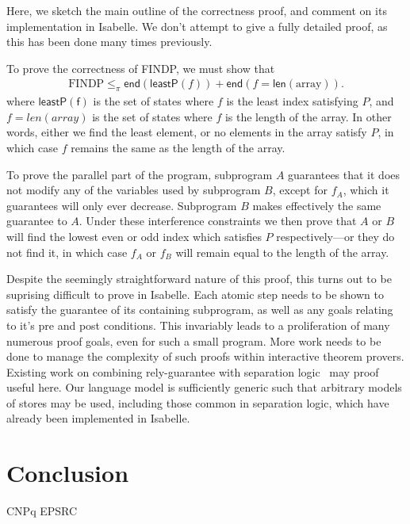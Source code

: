 \documentclass{llncs}
\newcommand{\edn}{\mathsf{end}}
\begin{document}
Here, we sketch the main outline of the correctness proof, and comment
on its implementation in Isabelle. We don't attempt to give a fully
detailed proof, as this has been done many times previously.

To prove the correctness of FINDP, we must show that
\begin{align*}
\text{FINDP} \le_\pi \edn(\mathsf{leastP}(f)) + \edn(f = \mathsf{len}(\text{array})).
\end{align*}
where $\mathsf{leastP(f)}$ is the set of states where $f$ is the least
index satisfying $P$, and $f = len(array)$ is the set of states where
$f$ is the length of the array. In other words, either we find the
least element, or no elements in the array satisfy $P$, in which case
$f$ remains the same as the length of the array.

To prove the parallel part of the program, subprogram $A$ guarantees
that it does not modify any of the variables used by subprogram $B$,
except for $f_A$, which it guarantees will only ever
decrease. Subprogram $B$ makes effectively the same guarantee to
$A$. Under these interference constraints we then prove that $A$ or
$B$ will find the lowest even or odd index which satisfies $P$
respectively---or they do not find it, in which case $f_A$ or $f_B$
will remain equal to the length of the array.

Despite the seemingly straightforward nature of this proof, this turns
out to be suprising difficult to prove in Isabelle. Each atomic step
needs to be shown to satisfy the guarantee of its containing
subprogram, as well as any goals relating to it's pre and post
conditions. This invariably leads to a proliferation of many numerous
proof goals, even for such a small program. More work needs to be done
to manage the complexity of such proofs within interactive theorem
provers. Existing work on combining rely-guarantee with separation
logic~\cite{vafeiadis_modular_2008} may proof useful here. Our language model is
sufficiently generic such that arbitrary models of stores may be used,
including those common in separation logic, which have already been
implemented in Isabelle.

\section{Conclusion}

CNPq EPSRC

{}

\end{document}
